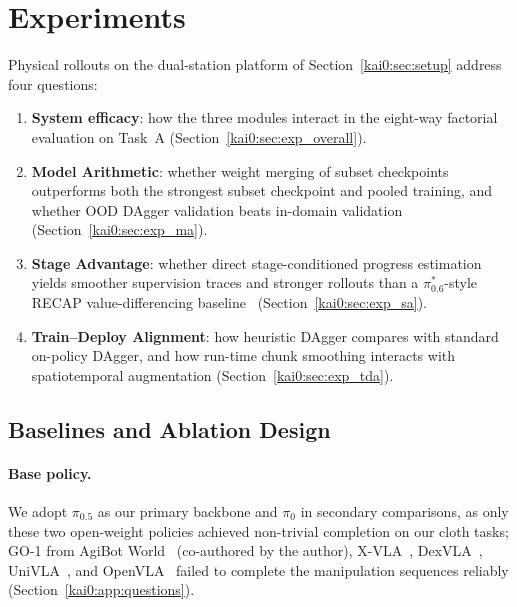 \section{Experiments}\label{kai0:sec:exp}

Physical rollouts on the dual-station platform of Section~\ref{kai0:sec:setup} address four questions:
\begin{enumerate}
  \item \textbf{System efficacy}: how the three modules interact in the eight-way factorial evaluation on Task~A (Section~\ref{kai0:sec:exp_overall}).
  \item \textbf{Model Arithmetic}: whether weight merging of subset checkpoints outperforms both the strongest subset checkpoint and pooled training, and whether OOD DAgger validation beats in-domain validation (Section~\ref{kai0:sec:exp_ma}).
  \item \textbf{Stage Advantage}: whether direct stage-conditioned progress estimation yields smoother supervision traces and stronger rollouts than a $\pi^{*}_{0.6}$-style RECAP value-differencing baseline~\cite{amin2026pistar06} (Section~\ref{kai0:sec:exp_sa}).
  \item \textbf{Train--Deploy Alignment}: how heuristic DAgger compares with standard on-policy DAgger, and how run-time chunk smoothing interacts with spatiotemporal augmentation (Section~\ref{kai0:sec:exp_tda}).
\end{enumerate}

\subsection{Baselines and Ablation Design}\label{kai0:sec:baselines}

\paragraph{Base policy.} We adopt $\pi_{0.5}$ as our primary backbone and $\pi_{0}$ in secondary comparisons, as only these two open-weight policies achieved non-trivial completion on our cloth tasks; GO-1 from AgiBot World~\cite{bu2025agibot_iros} (co-authored by the author), X-VLA~\cite{zheng2025xvla}, DexVLA~\cite{wen2025dexvla}, UniVLA~\cite{bu2025univla}, and OpenVLA~\cite{kim2024openvla} failed to complete the manipulation sequences reliably (Section~\ref{kai0:app:questions}).

